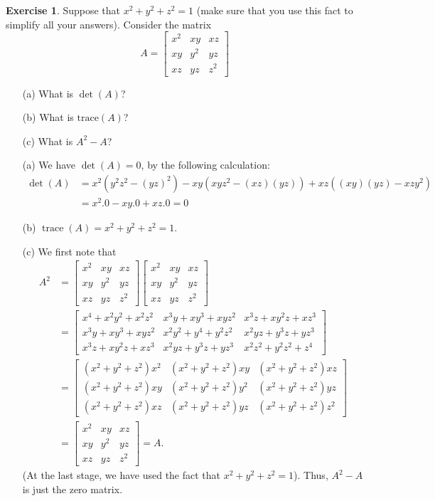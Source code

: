 \documentclass[a4paper]{book}
\newcommand{\bbm}       {\begin{bmatrix}}
\newcommand{\ebm}       {\end{bmatrix}}
\newcommand{\trc}       {\operatorname{trace}}
\renewcommand{\:}{\colon}
\theoremstyle{definition}
\newtheorem{exercise}[theorem]{Exercise}
\renewenvironment{solution}{\SolutionInline}{\endSolutionInline}
\begin{document}
\begin{exercise}
 Suppose that $x^2+y^2+z^2=1$ (make sure that you use this fact to
 simplify all your answers).  Consider the matrix
 \[ A = \bbm
          x^2 & xy  & xz  \\
          xy  & y^2 & yz  \\
          xz  & yz  & z^2
        \ebm
 \]
 \begin{itemize}
  \item[(a)] What is $\det(A)$?
  \item[(b)] What is $\text{trace}(A)$?
  \item[(c)] What is $A^2-A$?
 \end{itemize}
\end{exercise}
\begin{solution}
 \begin{itemize}
  \item[(a)] We have $\det(A)=0$, by the following calculation:
   \begin{align*}
    \det(A) &=   x^2(y^2z^2 - (yz)^2)
               - xy (xyz^2 - (xz)(yz))
               + xz ((xy)(yz) - xzy^2) \\
            &= x^2 . 0 - xy . 0 + xz . 0 = 0
   \end{align*}
  \item[(b)] $\trc(A)=x^2+y^2+z^2=1$.
  \item[(c)] We first note that
   \begin{align*}
    A^2 &=
       \bbm x^2&xy&xz \\ xy&y^2&yz \\ xz&yz&z^2 \ebm
       \bbm x^2&xy&xz \\ xy&y^2&yz \\ xz&yz&z^2 \ebm  \\
    &= \bbm
        x^4 + x^2y^2 + x^2z^2 &
        x^3y + xy^3 + xyz^2 &
        x^3z + xy^2z + x z^3 \\
        x^3y + xy^3 + xyz^2 &
        x^2y^2 + y^4 + y^2z^2 &
        x^2yz + y^3z + yz^3 \\
        x^3z + xy^2z + x z^3 &
        x^2yz + y^3z + yz^3 &
        x^2z^2 + y^2z^2 + z^4
       \ebm \\
    &= \bbm
        (x^2+y^2+z^2) x^2 &
        (x^2+y^2+z^2) xy &
        (x^2+y^2+z^2) xz \\
        (x^2+y^2+z^2) xy &
        (x^2+y^2+z^2) y^2 &
        (x^2+y^2+z^2) yz \\
        (x^2+y^2+z^2) xz &
        (x^2+y^2+z^2) yz &
        (x^2+y^2+z^2) z^2
       \ebm \\
    &= \bbm x^2&xy&xz \\ xy&y^2&yz \\ xz&yz&z^2 \ebm = A.
   \end{align*}
   (At the last stage, we have used the fact that $x^2+y^2+z^2=1$).
   Thus, $A^2-A$ is just the zero matrix.
 \end{itemize}

\end{solution}
\end{document}
